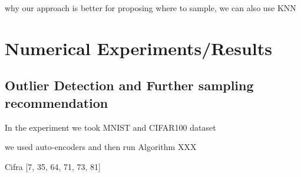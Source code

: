 \documentclass{article}
\begin{document}
why our approach is better for proposing where to sample, we can also use KNN










\clearpage
\section{Numerical Experiments/Results}


\subsection{Outlier Detection and Further sampling recommendation}

In the experiment we took MNIST and CIFAR100 dataset

we used  auto-encoders and then run Algorithm XXX





Cifra 
[7, 35, 64, 71, 73, 81]
\end{document}
